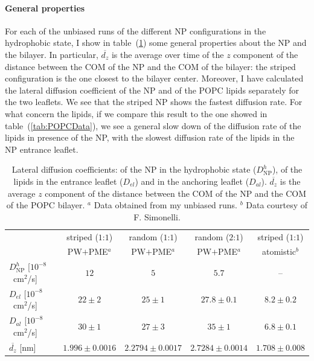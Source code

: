 \paragraph{\textbf{General properties}} For each of the unbiased runs of the different \ac{NP} configurations in the hydrophobic state, I show in table~(\ref{tab:NPMembProperties}) some general properties about the \ac{NP} and the bilayer. In particular, $\overline{d_z}$ is the average over time of the $z$ component of the distance between the \ac{COM} of the \ac{NP} and the \ac{COM} of the bilayer: the striped configuration is the one closest to the bilayer center. Moreover, I have calculated the lateral diffusion coefficient of the \ac{NP} and of the \ac{POPC} lipids separately for the two leaflets. We see that the striped \ac{NP} shows the fastest diffusion rate. For what concern the lipids, if we compare this result to the one showed in table~(\ref{tab:POPCData}), we see a general slow down of the diffusion rate of the lipids in presence of the \ac{NP}, with the slowest diffusion rate of the lipids in the \ac{NP} entrance leaflet.
\begin{table}[h!t]
	\centering\footnotesize
	\begin{tabular}{lcccc}
		\toprule
		\,		& striped ($1$:$1$)		& random ($1$:$1$)		& random ($2$:$1$)	& striped ($1$:$1$)	\\
		\,		& \acs{PW}$+$\acs{PME}$^a$ & \acs{PW}$+$\acs{PME}$^a$ & \acs{PW}$+$\acs{PME}$^a$ & atomistic$^b$ \\ \toprule
		$D^h_{\text{NP}}$ [$10^{-8}$~cm$^2$/s] & $12$ & $5$ & $5.7$ & –		 \\ \midrule
		$D_{el}$ [$10^{-8}$~cm$^2$/s] & $22 \pm 2$ & $25 \pm 1$ & $27.8 \pm 0.1$ & $8.2 \pm 0.2$	\\ \midrule
		$D_{al}$ [$10^{-8}$~cm$^2$/s] & $30 \pm 1$ & $27 \pm 3$	& $35 \pm 1$	& $6.8 	\pm 0.1$		\\ \midrule
		$\overline{d_z}$ [nm] & $1.996 \pm 0.0016$	& $2.2794 \pm 0.0017$	& $2.7284 \pm 0.0014$	& $1.708 \pm 0.008$\\ \bottomrule
	\end{tabular}
	\caption{Lateral diffusion coefficients: of the \acs{NP} in the hydrophobic state ($D^h_\text{NP}$), of the lipids in the entrance leaflet ($D_{el}$) and in the anchoring leaflet ($D_{al}$). $\overline{d_z}$ is the average $z$ component of the distance between the \acs{COM} of the \acs{NP} and the \acs{COM} of the \acs{POPC} bilayer. $^a$ Data obtained from my unbiased runs. $^b$ Data courtesy of F. Simonelli.}%
	\label{tab:NPMembProperties}
\end{table}

